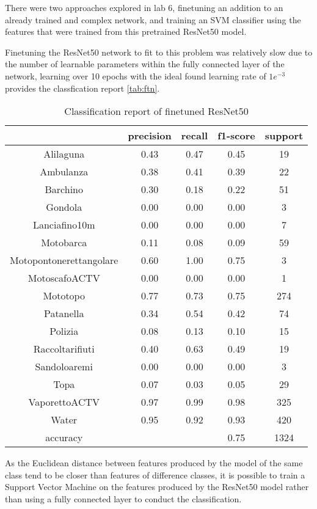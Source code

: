 \documentclass[sigconf]{acmart}
\begin{document}
There were two approaches explored in lab 6, finetuning an addition to an already trained and complex network, and training an SVM classifier using the features that were trained from this pretrained ResNet50 model.

Finetuning the ResNet50 network to fit to this problem was relatively slow due to the number of learnable parameters within the fully connected layer of the network, learning over 10 epochs with the ideal found learning rate of $1e^{-3}$ provides the classfication report \autoref{tab:ftn}.
\begin{table}[h!]
    \begin{tabular}{ |c c c c c| } 
     \hline

 & precision & recall & f1-score & support \\
\hline
     Alilaguna & 0.43 & 0.47 & 0.45 & 19\\
     Ambulanza & 0.38 & 0.41 & 0.39 & 22\\
      Barchino & 0.30 & 0.18 & 0.22 & 51\\
       Gondola & 0.00 & 0.00 & 0.00 & 3\\
 Lanciafino10m & 0.00 & 0.00 & 0.00 & 7\\
     Motobarca & 0.11 & 0.08 & 0.09 & 59\\
Motopontonerettangolare & 0.60 & 1.00 & 0.75 & 3\\
 MotoscafoACTV & 0.00 & 0.00 & 0.00 & 1\\
      Mototopo & 0.77 & 0.73 & 0.75 & 274\\
     Patanella & 0.34 & 0.54 & 0.42 & 74\\
       Polizia & 0.08 & 0.13 & 0.10 & 15\\
Raccoltarifiuti & 0.40 & 0.63 & 0.49 & 19\\
  Sandoloaremi & 0.00 & 0.00 & 0.00 & 3\\
          Topa & 0.07 & 0.03 & 0.05 & 29\\
 VaporettoACTV & 0.97 & 0.99 & 0.98 & 325\\
         Water & 0.95 & 0.92 & 0.93 & 420\\
\hline
      accuracy &  &  & 0.75 & 1324\\
               \hline
    \end{tabular}
    \caption{Classification report of finetuned ResNet50}
    \label{tab:ftn}
\end{table}

As the Euclidean distance between features produced by the model of the same class tend to be closer than features of difference classes, it is possible to train a Support Vector Machine on the features produced by the ResNet50 model rather than using a fully connected layer to conduct the classification.
\end{document}
